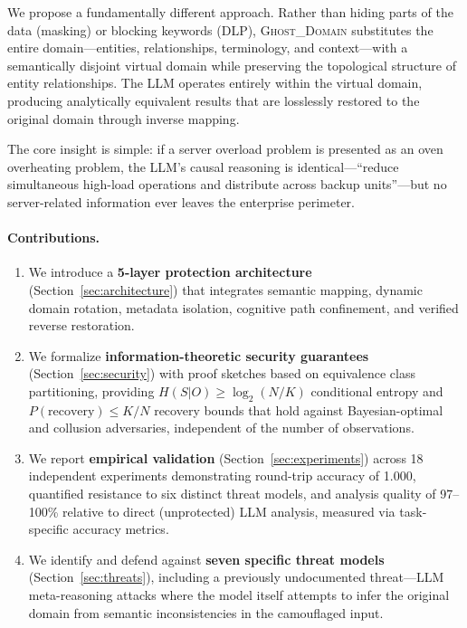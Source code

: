 \documentclass[11pt]{article}
\begin{document}
We propose a fundamentally different approach. Rather than hiding parts of the data (masking) or blocking keywords (DLP), \textsc{Ghost\_Domain} substitutes the entire domain---entities, relationships, terminology, and context---with a semantically disjoint virtual domain while preserving the topological structure of entity relationships. The LLM operates entirely within the virtual domain, producing analytically equivalent results that are losslessly restored to the original domain through inverse mapping.

The core insight is simple: if a server overload problem is presented as an oven overheating problem, the LLM's causal reasoning is identical---``reduce simultaneous high-load operations and distribute across backup units''---but no server-related information ever leaves the enterprise perimeter.

\paragraph{Contributions.}
\begin{enumerate}
\item We introduce a \textbf{5-layer protection architecture} (Section~\ref{sec:architecture}) that integrates semantic mapping, dynamic domain rotation, metadata isolation, cognitive path confinement, and verified reverse restoration.

\item We formalize \textbf{information-theoretic security guarantees} (Section~\ref{sec:security}) with proof sketches based on equivalence class partitioning, providing $H(S|O) \geq \log_2(N/K)$ conditional entropy and $P(\text{recovery}) \leq K/N$ recovery bounds that hold against Bayesian-optimal and collusion adversaries, independent of the number of observations.

\item We report \textbf{empirical validation} (Section~\ref{sec:experiments}) across 18 independent experiments demonstrating round-trip accuracy of 1.000, quantified resistance to six distinct threat models, and analysis quality of 97--100\% relative to direct (unprotected) LLM analysis, measured via task-specific accuracy metrics.

\item We identify and defend against \textbf{seven specific threat models} (Section~\ref{sec:threats}), including a previously undocumented threat---LLM meta-reasoning attacks where the model itself attempts to infer the original domain from semantic inconsistencies in the camouflaged input.
\end{enumerate}
\end{document}
